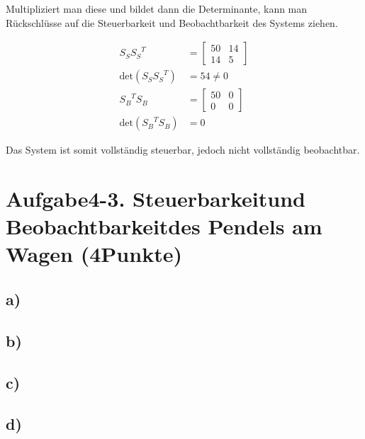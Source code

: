 \documentclass[11pt]{scrartcl} %
\begin{document}
Multipliziert man diese und bildet dann die Determinante, kann man Rückschlüsse auf die Steuerbarkeit und Beobachtbarkeit des Systems ziehen.

\begin{align*}
S_S{S_S}^T&=\begin{bmatrix}
50 & 14\\
14 & 5
\end{bmatrix}\\
\text{det}\left( S_S{S_S}^T \right) &= 54 \neq 0\\
{S_B}^TS_B&=\begin{bmatrix}
50 & 0\\
0 & 0
\end{bmatrix}\\
\text{det}\left( {S_B}^TS_B \right) &= 0
\end{align*}

Das System ist somit vollständig steuerbar, jedoch nicht vollständig beobachtbar.


\section*{Aufgabe4-3. Steuerbarkeitund Beobachtbarkeitdes Pendels am Wagen (4Punkte)}
\subsection*{a)}

\subsection*{b)}

\subsection*{c)}

\subsection*{d)}
\end{document}
